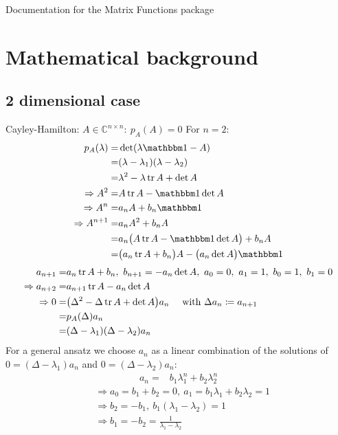 \documentclass{article}
\begin{document}
\centerline{\sc \large Documentation for the Matrix Functions package}
\vspace{.5pc}
\vspace{2pc}

\tableofcontents

\section{Mathematical background}
\subsection{2 dimensional case}
Cayley-Hamilton: $A\in \mathbb C^{n\times n}:\ p_A(A)=0$
For $n=2$:
\begin{align}
p_A(\lambda) =& \det(\lambda\mathbbm 1 - A) \nonumber\\
=& (\lambda - \lambda_1)(\lambda - \lambda_2) \nonumber\\
=& \lambda^2 -\lambda\tr A + \det A\\
\Rightarrow A^2 =& A \tr A - \mathbbm 1 \det A\\
\Rightarrow A^n =& a_n A + b_n\mathbbm 1\\
\Rightarrow A^{n+1} =& a_n A^2 + b_n A \nonumber\\
=& a_n \big( A\tr A - \mathbbm 1\det A \big) + b_n A \nonumber\\
=& \big(a_n\tr A + b_n\big)A - \big(a_n\det A \big)\mathbbm 1 \nonumber
\end{align}
\begin{align}
a_{n+1} =& a_n\tr A + b_n,\ b_{n+1} = -a_n\det A,\ a_0=0,\ a_1=1,\ b_0=1,\ b_1=0 \label{recurrent 2dim}\\
\Rightarrow a_{n+2} =& a_{n+1}\tr A - a_n\det A \nonumber\\
\Rightarrow 0 =& \big(\Delta^2 - \Delta\tr A + \det A\big) a_n\ \ \ \ \text{with}\ \Delta a_n \coloneqq a_{n+1} \nonumber\\
=& p_A(\Delta) a_n\nonumber\\
=& (\Delta-\lambda_1)(\Delta-\lambda_2) a_n
\end{align}
For a general ansatz we choose $a_n$ as a linear combination of the solutions of $0=(\Delta-\lambda_1)a_n$ and $0=(\Delta-\lambda_2)a_n$:
\begin{align}
a_n =& b_1 \lambda_1^n + b_2\lambda_2^n
\end{align}
\begin{align}
&\Rightarrow a_0 = b_1 + b_2 = 0,\ a_1 = b_1\lambda_1 + b_2\lambda_2 = 1 \nonumber\\
&\Rightarrow b_2 = -b_1,\ b_1(\lambda_1 - \lambda_2) = 1 \nonumber\\
&\Rightarrow b_1 = -b_2 = \frac 1 {\lambda_1 - \lambda_2}
\end{align}
\end{document}
